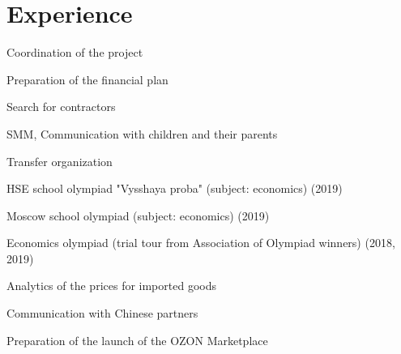 \documentclass[]{deedy-resume-openfont}
\begin{document}
\begin{minipage}[t]{0.66\textwidth} 


\section{Experience}

\vspace{\topsep} %
\begin{tightemize}\item Coordination of the project \item Preparation of the financial plan \item Search for contractors \item SMM, Communication with children and their parents \item Transfer organization
\end{tightemize}
\sectionsep

\begin{tightemize}
\item HSE school olympiad "Vysshaya proba" (subject: economics) (2019) \item Moscow school olympiad (subject: economics) (2019) \item Economics olympiad (trial tour from Association of Olympiad winners) (2018, 2019)\end{tightemize}
\sectionsep

\sectionsep

\begin{tightemize}
\item Analytics of the prices for imported goods \item Communication with Chinese partners \item Preparation of the launch of the OZON Marketplace\end{tightemize}
\sectionsep



\end{minipage}
\end{document}
